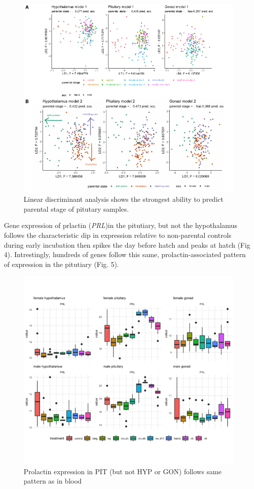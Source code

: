 \documentclass[10pt,letterpaper]{article}
\begin{document}
\begin{figure}
\centering
\includegraphics{characterization_manuscript_files/figure-latex/unnamed-chunk-4-1.pdf}
\caption{Linear discriminant analysis shows the strongest ability to
predict parental stage of pitutary samples.}
\end{figure}

Gene expression of prlactin (\emph{PRL})in the pitutiary, but not the
hypothalamus follows the characteristic dip in expression relative to
non-parental controls during early incubation then spikes the day before
hatch and peaks at hatch (Fig 4). Intrestingly, hundreds of genes follow
this same, prolactin-associated pattern of expression in the pitutiary
(Fig. 5).

\begin{figure}
\centering
\includegraphics{characterization_manuscript_files/figure-latex/unnamed-chunk-5-1.pdf}
\caption{Prolactin expression in PIT (but not HYP or GON) follows same
pattern as in blood}
\end{figure}
\end{document}
